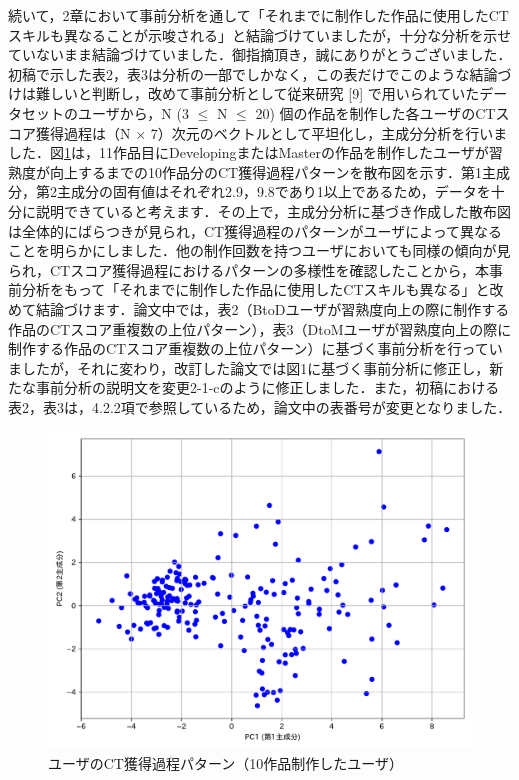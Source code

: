 \documentclass{jarticle} %
\begin{document}
続いて，2章において事前分析を通して「それまでに制作した作品に使用したCTスキルも異なることが示唆される」と結論づけていましたが，十分な分析を示せていないまま結論づけていました．御指摘頂き，誠にありがとうございました．初稿で示した表2，表3は分析の一部でしかなく，この表だけでこのような結論づけは難しいと判断し，改めて事前分析として従来研究 [9] で用いられていたデータセットのユーザから，N (3 $\le$ N $\le$ 20) 個の作品を制作した各ユーザのCTスコア獲得過程は（N $\times$ 7）次元のベクトルとして平坦化し，主成分分析を行いました．図\ref{fig:pca}は，11作品目にDevelopingまたはMasterの作品を制作したユーザが習熟度が向上するまでの10作品分のCT獲得過程パターンを散布図を示す．第1主成分，第2主成分の固有値はそれぞれ2.9，9.8であり1以上であるため，データを十分に説明できていると考えます．その上で，主成分分析に基づき作成した散布図は全体的にばらつきが見られ，CT獲得過程のパターンがユーザによって異なることを明らかにしました．他の制作回数を持つユーザにおいても同様の傾向が見られ，CTスコア獲得過程におけるパターンの多様性を確認したことから，本事前分析をもって「それまでに制作した作品に使用したCTスキルも異なる」と改めて結論づけます．論文中では，表2（BtoDユーザが習熟度向上の際に制作する作品のCTスコア重複数の上位パターン），表3（DtoMユーザが習熟度向上の際に制作する作品のCTスコア重複数の上位パターン）に基づく事前分析を行っていましたが，それに変わり，改訂した論文では図1に基づく事前分析に修正し，新たな事前分析の説明文を変更2-1-cのように修正しました．また，初稿における表2，表3は，4.2.2項で参照しているため，論文中の表番号が変更となりました．


\begin{figure}[h]
	\centering
	\includegraphics[width=0.7\linewidth]{Okamoto_fig/pca-10.pdf}
	\caption{ユーザのCT獲得過程パターン（10作品制作したユーザ）}
	\label{fig:pca}
 \vspace{-2mm}
\end{figure}
\end{document}

